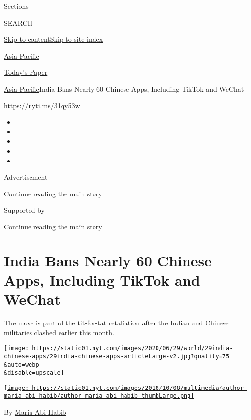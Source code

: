 Sections

SEARCH

\protect\hyperlink{site-content}{Skip to
content}\protect\hyperlink{site-index}{Skip to site index}

\href{https://www.nytimes.com/section/world/asia}{Asia Pacific}

\href{https://myaccount.nytimes.com/auth/login?response_type=cookie\&client_id=vi}{}

\href{https://www.nytimes.com/section/todayspaper}{Today's Paper}

\href{/section/world/asia}{Asia Pacific}\textbar{}India Bans Nearly 60
Chinese Apps, Including TikTok and WeChat

\url{https://nyti.ms/31qy53w}

\begin{itemize}
\item
\item
\item
\item
\item
\end{itemize}

Advertisement

\protect\hyperlink{after-top}{Continue reading the main story}

Supported by

\protect\hyperlink{after-sponsor}{Continue reading the main story}

\hypertarget{india-bans-nearly-60-chinese-apps-including-tiktok-and-wechat}{%
\section{India Bans Nearly 60 Chinese Apps, Including TikTok and
WeChat}\label{india-bans-nearly-60-chinese-apps-including-tiktok-and-wechat}}

The move is part of the tit-for-tat retaliation after the Indian and
Chinese militaries clashed earlier this month.

\texttt{[image: https://static01.nyt.com/images/2020/06/29/world/29india-chinese-apps/29india-chinese-apps-articleLarge-v2.jpg?quality=75\\\&auto=webp\\\&disable=upscale]}

\href{https://www.nytimes.com/by/maria-abi-habib}{\texttt{[image: https://static01.nyt.com/images/2018/10/08/multimedia/author-maria-abi-habib/author-maria-abi-habib-thumbLarge.png]}}

By \href{https://www.nytimes.com/by/maria-abi-habib}{Maria Abi-Habib}

